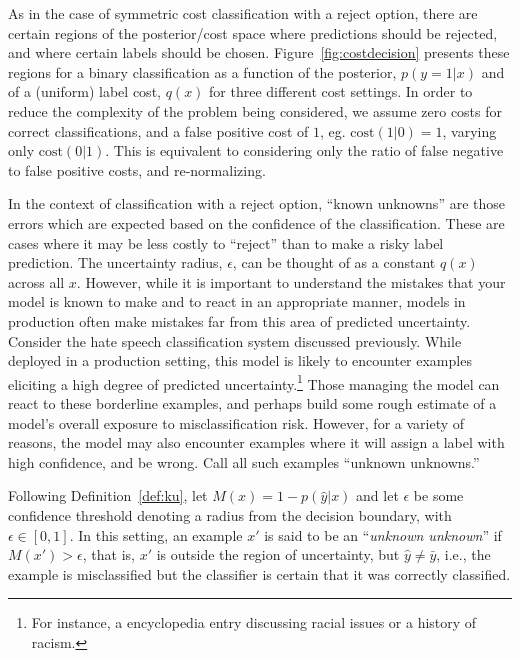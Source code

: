 As in the case of symmetric cost classification with a reject option, there are certain regions of the posterior/cost space where predictions should be rejected, and where certain labels should be chosen. Figure~\ref{fig:costdecision} presents these regions for a binary classification as a function of the posterior, $p(y=1|x)$ and of a (uniform) label cost, $q(x)$ for three different cost settings. In order to reduce the complexity of the problem being considered, we assume zero costs for correct classifications, and a false positive cost of $1$, eg. $\mbox{cost}(1|0)=1$, varying only $\mbox{cost}(0|1)$. This is equivalent to considering only the ratio of false negative to false positive costs, and re-normalizing.

In the context of classification with a reject option, ``known unknowns'' are those errors which are expected based on the confidence of the classification.  These are cases where it may be less costly to ``reject'' than to make a risky label prediction. The uncertainty radius, $\epsilon$, can be thought of as a constant $q(x)$ across all $x$.  However, while it is important to understand the mistakes that your model is known to make and to react in an appropriate manner, models in production often make mistakes far from this area of predicted uncertainty. Consider the hate speech classification system discussed previously. While deployed in a production setting, this model is likely to encounter examples eliciting a high degree of predicted uncertainty.\footnote{For instance, a encyclopedia entry discussing racial issues or a history of racism.} Those managing the model can react to these borderline examples, and perhaps build some rough estimate of a model's overall exposure to misclassification risk. However, for a variety of reasons, the model may also encounter examples where it will assign a label with high confidence, and be wrong. Call all such examples ``unknown unknowns.''

\begin{definition}
\label{def:uu}
Following Definition~\ref{def:ku}, let $M(x) = 1-p(\hat{y} | x)$ and let $\epsilon$ be some confidence threshold denoting a  radius from the decision boundary, with $\epsilon \in [0,1]$. In this setting, an example $x'$ is said to be an ``\emph{unknown unknown}'' if $M(x') > \epsilon$, that is, $x'$ is outside the region of uncertainty, but $\hat{y} \neq \bar{y}$, i.e., the example is misclassified but the classifier is certain that it was correctly classified.
\end{definition}

